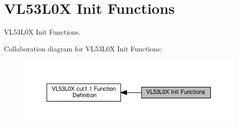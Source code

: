 \hypertarget{group__VL53L0X__init__group}{}\section{V\+L53\+L0X Init Functions}
\label{group__VL53L0X__init__group}


V\+L53\+L0X Init Functions.  


Collaboration diagram for V\+L53\+L0X Init Functions\+:\nopagebreak
\begin{figure}[H]
\begin{center}
\leavevmode
\includegraphics[width=350pt]{group__VL53L0X__init__group}
\end{center}
\end{figure}
